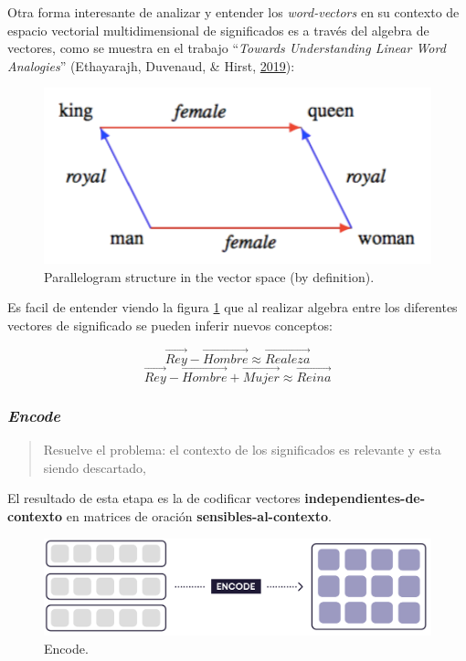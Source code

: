 \documentclass[12pt,a4paper,]{scrartcl}
\begin{document}
Otra forma interesante de analizar y entender los \emph{word-vectors} en su contexto de espacio vectorial multidimensional de significados es a través del algebra de vectores, como se muestra en el trabajo \enquote{\emph{Towards Understanding Linear Word Analogies}} (Ethayarajh, Duvenaud, \& Hirst, \protect\hyperlink{ref-ethayarajh-etal-2019-towards}{2019}):

\begin{figure}[H]

{\centering \includegraphics{assets/parallelogram.pdf} 

}

\caption{Parallelogram structure in the vector space (by definition).}\label{fig:vec-parallelogram}
\end{figure}

Es facil de entender viendo la figura \ref{fig:vec-parallelogram} que al realizar algebra entre los diferentes vectores de significado se pueden inferir nuevos conceptos:

\[\vec{Rey} - \vec{Hombre} \approx \vec{Realeza}\]
\[\vec{Rey} - \vec{Hombre} + \vec{Mujer} \approx \vec{Reina}\]

\hypertarget{encode}{%
\subsubsection{\texorpdfstring{\emph{Encode}}{Encode}}\label{encode}}

\begin{quote}
Resuelve el problema: el contexto de los significados es relevante y esta siendo descartado,
\end{quote}

El resultado de esta etapa es la de codificar vectores \textbf{independientes-de-contexto} en matrices de oración \textbf{sensibles-al-contexto}.

\begin{figure}[H]

{\centering \includegraphics{assets/deep-learning-formula-nlp_encode.pdf} 

}

\caption{Encode.}\label{fig:formula-encode}
\end{figure}
\end{document}
